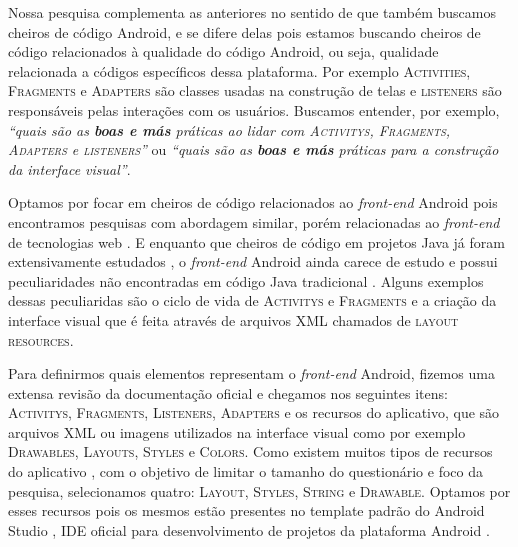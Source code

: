 Nossa pesquisa complementa as anteriores no sentido de que tamb\'em buscamos cheiros de c\'odigo Android, e se difere delas pois estamos buscando cheiros de c\'odigo relacionados \`a qualidade do c\'odigo Android, ou seja, qualidade relacionada a c\'odigos espec\'ificos dessa plataforma. Por exemplo \textsc{Activities}, \textsc{Fragments} e \textsc{Adapters} s\~ao classes usadas na constru\c{c}\~ao de telas e \textsc{listeners} s\~ao respons\'aveis pelas intera\c{c}\~oes com os usu\'arios. Buscamos entender, por exemplo, \textit{``quais s\~ao as \textbf{boas e m\'as} pr\'aticas ao lidar com \textsc{Activitys}, \textsc{Fragments}, \textsc{Adapters} e \textsc{listeners}''} ou \textit{``quais s\~ao as \textbf{boas e m\'as} pr\'aticas para a constru\c{c}\~ao da interface visual''}. 

Optamos por focar em cheiros de código relacionados ao \textit{front-end} Android pois encontramos pesquisas com abordagem similar, por\'em relacionadas ao \textit{front-end} de tecnologias web \cite{CSSCodeSmell, BB, FinavaroAniche2016}. E enquanto que cheiros de c\'odigo em projetos Java j\'a foram extensivamente estudados \cite{Riel, Refactoring:99, Martin:2008:CCH:1388398}, o \textit{front-end} Android ainda carece de estudo e possui peculiaridades n\~ao encontradas em c\'odigo Java tradicional \cite{Mannan_Dig_Ahmed_Jensen_Abdullah_Almurshed}. Alguns exemplos dessas peculiaridas s\~ao o ciclo de vida de \textsc{Activitys} e \textsc{Fragments} e a cria\c{c}\~ao da interface visual que \'e feita atrav\'es de arquivos XML chamados de \textsc{layout resources}.

Para definirmos quais elementos representam o \textit{front-end} Android, fizemos uma extensa revis\~ao da documenta\c{c}\~ao oficial \cite{AndroidDeveloperSite2016} e chegamos nos seguintes itens: \textsc{Activitys}, \textsc{Fragments}, \textsc{Listeners}, \textsc{Adapters} e os recursos do aplicativo, que s\~ao arquivos XML ou imagens utilizados na interface visual como por exemplo \textsc{Drawables}, \textsc{Layouts}, \textsc{Styles} e \textsc{Colors}. Como existem muitos tipos de recursos do aplicativo \cite{AndroidResourcesOverview}, com o objetivo de limitar o tamanho do question\'ario e foco da pesquisa, selecionamos quatro: \textsc{Layout}, \textsc{Styles}, \textsc{String} e \textsc{Drawable}. Optamos por esses recursos pois os mesmos est\~ao presentes no template padr\~ao do Android Studio \cite{FirstApp2017}, IDE oficial para desenvolvimento de projetos da plataforma Android \cite{AndroidStudio}. 

